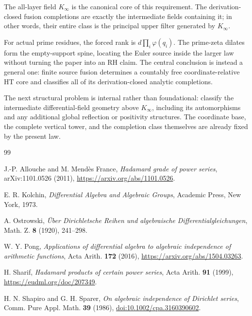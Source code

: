 \documentclass[11pt]{article}
\theoremstyle{definition}
\theoremstyle{remark}
\begin{document}
The all-layer field \(K_\infty\) is the canonical core of this requirement.  The
derivation-closed fusion completions are exactly the intermediate fields containing it; in other
words, their entire class is the principal upper filter generated by \(K_\infty\).

For actual prime residues, the forced rank is \(d\prod_i\varphi(q_i)\).  The prime-zeta dilates
form the empty-support spine, locating the Euler source inside the larger law without turning the
paper into an RH claim.  The central conclusion is instead a general one: finite source fusion
determines a countably free coordinate-relative HT core and classifies all of its
derivation-closed analytic completions.

The next structural problem is internal rather than foundational: classify the intermediate
differential-field geometry above \(K_\infty\), including its automorphisms and any additional
global reflection or positivity structures.  The coordinate base, the complete vertical tower,
and the completion class themselves are already fixed by the present law.

\begin{thebibliography}{99}

J.-P. Allouche and M. Mend\`es France,
\emph{Hadamard grade of power series},
arXiv:1101.0526 (2011),
\url{https://arxiv.org/abs/1101.0526}.

E. R. Kolchin,
\emph{Differential Algebra and Algebraic Groups},
Academic Press, New York, 1973.

A. Ostrowski,
\emph{\"Uber Dirichletsche Reihen und algebraische Differentialgleichungen},
Math. Z. \textbf{8} (1920), 241--298.

W. Y. Pong,
\emph{Applications of differential algebra to algebraic independence of arithmetic functions},
Acta Arith. \textbf{172} (2016),
\url{https://arxiv.org/abs/1504.03263}.

H. Sharif,
\emph{Hadamard products of certain power series},
Acta Arith. \textbf{91} (1999),
\url{https://eudml.org/doc/207349}.

H. N. Shapiro and G. H. Sparer,
\emph{On algebraic independence of Dirichlet series},
Comm. Pure Appl. Math. \textbf{39} (1986),
\href{https://doi.org/10.1002/cpa.3160390602}{doi:10.1002/cpa.3160390602}.

\end{thebibliography}
\end{document}
